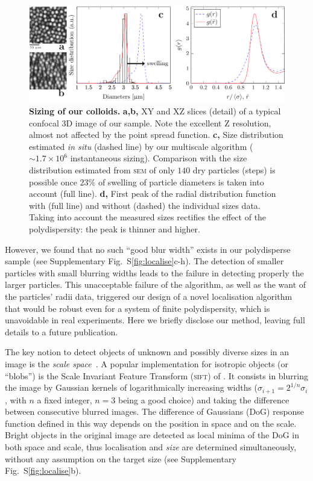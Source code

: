 \documentclass[prl,twocolumn,notitlepage]{revtex4-1}
\begin{document}
\begin{figure}
\begin{center}
\includegraphics{generate_figures-figure6.pdf}
\end{center}
	\caption{\textbf{Sizing of our colloids.} \textbf{a,b,} XY and XZ slices (detail) of a typical confocal 3D image of our sample. Note the excellent Z resolution, almost not affected by the point spread function. \textbf{c,} Size distribution estimated \emph{in situ} (dashed line) by our multiscale algorithm ($\sim 1.7\times 10^6$ instantaneous sizing). Comparison with the size distribution estimated from \textsc{sem} of only $140$ dry particles (steps) is possible once $23\%$ of swelling of particle diameters is taken into account (full line). \textbf{d,} First peak of the radial distribution function with (full line) and without (dashed) the individual sizes data. Taking into account the measured sizes rectifies the effect of the polydispersity: the peak is thinner and higher.}
	\label{fig:sizing}
\end{figure}

However, we found that no such ``good blur width'' exists in our polydisperse sample (see Supplementary Fig.~S\ref{fig:localise}c-h). The detection of smaller particles with small blurring widths leads to the failure in detecting properly the larger particles. This unacceptable failure of the \citet{Crocker1996} algorithm, as well as the want of the particles' radii data, triggered our design of a novel localisation algorithm that would be robust even for a system of finite polydispersity, which is unavoidable in real experiments. Here we briefly disclose our method, leaving full details to a future publication.

The key notion to detect objects of unknown and possibly diverse sizes in an image is the \emph{scale space}~\cite{Lindeberg1993}. A popular implementation for isotropic objects (or ``blobs'') is the Scale Invariant Feature Transform (\textsc{sift}) of \citet{Lowe2004}. It consists  in blurring the image by Gaussian kernels of logarithmically increasing widths ($\sigma_{i+1} = 2^{1/n} \sigma_i$, with $n$ a fixed integer, $n=3$ being a good choice) and taking the difference between consecutive blurred images. The difference of Gaussians (DoG) response function defined in this way depends on the position in space and on the scale. Bright objects in the original image are detected as local minima of the DoG in both space and scale, thus localisation and \emph{size} are determined simultaneously, without any assumption on the target size (see Supplementary Fig.~S\ref{fig:localise}b).
\end{document}
